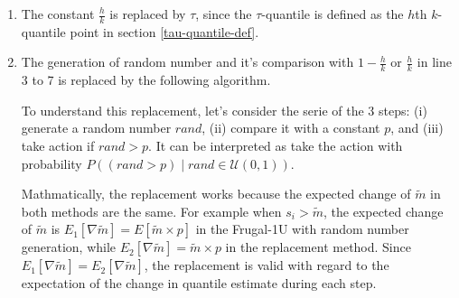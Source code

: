 \documentclass[11pt]{article}
\begin{document}
\begin{enumerate}
    \item The constant $\frac{h}{k}$ is replaced by $\tau$, since the $\tau$-quantile is defined
     as the $h$th $k$-quantile point in section \ref{tau-quantile-def}.
    \item The generation of random number and it's comparison with $1-\frac{h}{k}$ or $\frac{h}{k}$
    in line 3 to 7 is replaced by the following algorithm.
    \begin{algorithm}
        \begin{algorithmic}[1]
            \setcounter{ALG@line}{2}
            \State{ }   
            \EndIf 
        \end{algorithmic}
    \end{algorithm}

    
    To understand this replacement, let's consider the serie of the 3 steps: 
    (i) generate a random number $rand$, 
    (ii) compare it with a constant $p$, and
    (iii) take action if $rand > p$. 
    It can be interpreted as take the action with probability 
    $P((rand > p) \mid rand \in \mathcal{U}(0,1))$. 

    Mathmatically, the replacement works because the expected change of
    $\tilde{m}$ in both methods are the same. 
    For example when $s_i > \tilde{m}$, 
    the expected change of $\tilde{m}$ is
    $E_1[\nabla \tilde{m}] = E[\tilde{m} \times p]$ in the Frugal-1U with 
    random number generation,
    while 
    $E_2[\nabla \tilde{m}] = \tilde{m} \times p$ in the replacement method.
    Since $E_1[\nabla \tilde{m}] = E_2[\nabla \tilde{m}]$, the replacement is valid
    with regard to the expectation of the change in quantile estimate during each step.

\end{enumerate}
\end{document}
